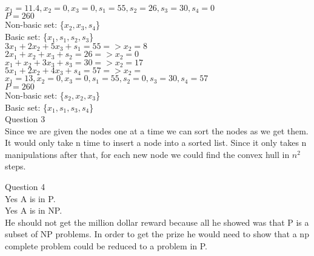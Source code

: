 \documentclass{article}
\begin{document}
${      x_1 = 11.4, x_2 = 0, x_3 = 0, s_1 = 55, s_2 = 26, s_3 = 30, s_4 = 0}$\\
${P = 260}$\\
Non-basic set: \{${x_2, x_3, s_4}$\}\\
Basic set: \{${x_1, s_1, s_2, s_3}$\}\\

${     3x_1 +  2x_2 +  5x_3 + s_1 = 55 => x_2=8}$\\
${     2x_1 +   x_2 +   x_3 + s_2 = 26 => x_2=0}$\\
${      x_1 +   x_2 +  3x_3 + s_3 = 30 => x_2=17}$\\
${     5x_1 +  2x_2 +  4x_3 + s_4 = 57 => x_2=}$\\

${      x_1 = 13, x_2 = 0, x_3 = 0, s_1 = 55, s_2 = 0, s_3 = 30, s_4 = 57}$\\
${P = 260}$\\
Non-basic set: \{${s_2, x_2, x_3}$\}\\
Basic set: \{${x_1, s_1, s_3, s_4}$\}\\


Question 3\\
Since we are given the nodes one at a time we can sort the nodes as we get them. 
It would only take n time to insert a node into a sorted list.
Since it only takes n manipulations after that, for each new node we could find the convex hull in ${n^2}$ steps.

Question 4\\
Yes A is in P.\\
Yes A is in NP.\\
He should not get the million dollar reward because all he showed was that P is a subset of NP problems.
In order to get the prize he would need to show that a np complete problem could be reduced to a problem in P.\\
\end{document}
